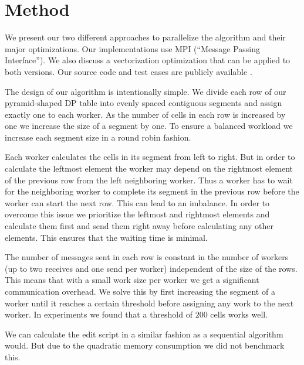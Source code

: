 \section{Method}\label{sec:yourmethod}
We present our two different approaches to parallelize the algorithm and their major optimizations. Our implementations use MPI (``Message Passing Interface''). We also discuss a vectorization optimization that can be applied to both versions. Our source code and test cases are publicly available \cite{our_source}.



The design of our algorithm is intentionally simple. We divide each row of our pyramid-shaped DP table into evenly spaced contiguous segments and assign exactly one to each worker. As the number of cells in each row is increased by one we increase the size of a segment by one. To ensure a balanced workload we increase each segment size in a round robin fashion.

Each worker calculates the cells in its segment from left to right. But in order to calculate the leftmost element the worker may depend on the rightmost element of the previous row from the left neighboring worker. Thus a worker has to wait for the neighboring worker to complete its segment in the previous row before the worker can start the next row. This can lead to an imbalance. In order to overcome this issue we prioritize the leftmost and rightmost elements and calculate them first and send them right away before calculating any other elements. This ensures that the waiting time is minimal.
    
The number of messages sent in each row is constant in the number of workers (up to two receives and one send per worker) independent of the size of the rows. This means that with a small work size per worker we get a significant communication overhead. We solve this by first increasing the segment of a worker until it reaches a certain threshold before assigning any work to the next worker. In experiments we found that a threshold of $200$ cells works well.

We can calculate the edit script in a similar fashion as a sequential algorithm would. But due to the quadratic memory consumption we did not benchmark this.

